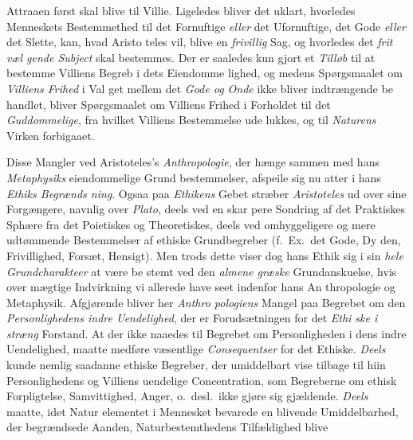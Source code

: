 Attraaen først skal blive til Villie. Ligeledes bliver det uklart,
hvorledes Menneskets Bestemmethed til det Fornuftige \emph{eller}
det Ufornuftige, det Gode \emph{eller} det Slette, kan, hvad Aristo\-%
teles vil, blive en \emph{frivillig} Sag, og hvorledes det \emph{frit væl\-%
gende Subject} skal bestemmes. Der er saaledes kun gjort
et \emph{Tilløb} til at bestemme Villiens Begreb i dets Eiendomme\-%
lighed, og medens Spørgsmaalet om \emph{Villiens Frihed} i Val\-%
get mellem det \emph{Gode og Onde} ikke bliver indtrængende be\-%
handlet, bliver Spørgsmaalet om Villiens Frihed i Forholdet til
det \emph{Guddommelige}, fra hvilket Villiens Bestemmelse ude\-%
lukkes, og til \emph{Naturens} Virken forbigaaet.

Disse Mangler ved Aristoteles's \emph{Anthropologie}, der
hænge sammen med hans \emph{Metaphysiks} eiendommelige Grund\-%
bestemmelser, afspeile sig nu atter i hans \emph{Ethiks Begrænds\-%
ning}.
 Ogsaa paa \emph{Ethikens} Gebet stræber \emph{Aristoteles} ud
over sine Forgængere, navnlig over \emph{Plato}, deels ved en skar\-%
pere Sondring af det Praktiskes Sphære fra det Poietiskes og
Theoretiskes, deels ved omhyggeligere og mere udtømmende
Bestemmelser af ethiske Grundbegreber (f.\ Ex.\ det Gode, Dy\-%
den, Frivillighed, Forsæt, Hensigt). Men trods dette viser dog
hans Ethik sig i sin \emph{hele Grundcharakteer} at være be\-%
stemt ved den \emph{almene græske} Grundanskuelse, hvis over\-%
mægtige Indvirkning vi allerede have seet indenfor hans An\-%
thropologie og Metaphysik. Afgjørende bliver her \emph{Anthro\-%
pologiens} Mangel paa Begrebet om den \emph{Personlighedens
indre Uendelighed}, der er Forudsætningen for det \emph{Ethi\-%
ske i stræng} Forstand. At der ikke naaedes til Begrebet
om Personligheden i dens indre Uendelighed, maatte medføre
væsentlige \emph{Consequentser} for det Ethiske. \emph{Deels} kunde
nemlig saadanne ethiske Begreber, der umiddelbart vise tilbage
til hiin Personlighedens og Villiens uendelige Concentration,
som Begreberne om ethisk Forpligtelse, Samvittighed, Anger,
o.\ desl.\ ikke gjøre sig gjældende. \emph{Deels} maatte, idet Natur\-%
elementet i Mennesket bevarede en blivende Umiddelbarhed,
der begrændsede Aanden, Naturbestemthedens Tilfældighed blive
